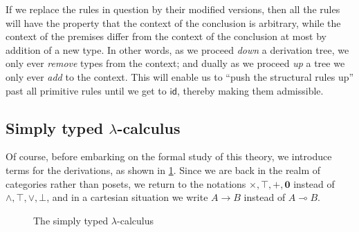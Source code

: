 \documentclass{book}
\def\idfunc{\mathsf{id}}
\let\types\vdash
\def\type{\;\ftype}
\let\meet\wedge
\let\join\vee
\def\unit{\top}%
\def\ttt{\mathord{\ast}}%
\def\timesE{\ensuremath{\mathord{\times}E}}
\def\timesI{\ensuremath{\mathord{\times}I}}
\def\pair#1#2{\langle #1,#2\rangle}
\def\pr#1#2#3{\pi_{#1}^{#2,#3}}
\def\plusE{\mathord{+}E}
\def\plusI{\mathord{+}I}
\def\inl{\mathsf{inl}}
\def\inr{\mathsf{inr}}
\def\acase#1#2{\mathsf{match}_{#1+#2}}
\def\match{\mathsf{match}}
\def\zero{\mathbf{0}}
\def\abort{\match_{\zero}}
\let\hom\multimap
\def\toI{\mathord{\to}I}
\def\toE{\mathord{\to}E}
\begin{document}
If we replace the rules in question by their modified versions, then all the rules will have the property that the context of the conclusion is arbitrary, while the context of the premises differ from the context of the conclusion at most by addition of a new type.
In other words, as we proceed \emph{down} a derivation tree, we only ever \emph{remove} types from the context; and dually as we proceed \emph{up} a tree we only ever \emph{add} to the context.
This will enable us to ``push the structural rules up'' past all primitive rules until we get to $\idfunc$, thereby making them admissible.

\subsection{Simply typed $\lambda$-calculus}
\label{subsec:stlc}

Of course, before embarking on the formal study of this theory, we introduce terms for the derivations, as shown in \cref{fig:stlc}.
Since we are back in the realm of categories rather than posets, we return to the notations $\times,\unit,+,\zero$ instead of $\meet,\top,\join,\bot$, and in a cartesian situation we write $A\to B$ instead of $A\hom B$.

\begin{figure}
  \centering
  \caption{The simply typed $\lambda$-calculus}
  \label{fig:stlc}
\end{figure}
\end{document}
